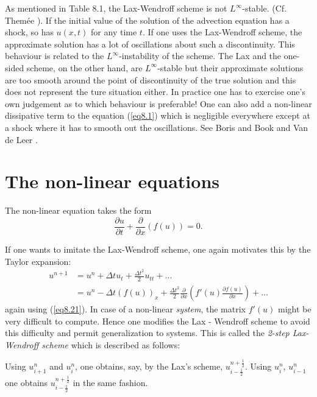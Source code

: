 \begin{remark}\label{chap8:rem8.4}
As mentioned in Table 8.1, the Lax-Wendroff scheme is not
$L^\infty$-stable. (Cf. Them\'ee \cite{key36}). If the initial value
of the solution of the advection equation has a shock, so has $u(x,t)$
for any time $t$. If one uses the Lax-Wendroff scheme, the approximate
solution has a lot of oscillations about such a discontinuity. This
behaviour is related to the $L^\infty$-instability of the scheme. The
Lax and the one-sided scheme, on the other hand, are $L^\infty$-stable
but their approximate solutions are too smooth around the point of
discontinuity of the true solution and this does not represent the
ture situation either. In practice one has to exercise one's own
judgement as to which behaviour is preferable! One can also add a
non-linear dissipative term to the equation (\ref{eq8.1}) which is
negligible everywhere except at a shock where it has to smooth out the
oscillations. See Boris and Book \cite{key4} and Van de Leer
\cite{key37}. 
\end{remark}

\section{The non-linear equations}\label{chap8:sec8.5}
The non-linear equation takes the form
\begin{equation*}
\frac{\partial u}{\partial t} + \frac{\partial}{\partial x} (f(u)) = 0.
\tag{8.21}\label{eq8.21}
\end{equation*}

If one wants to imitate the Lax-Wendroff scheme, one again motivates this by the Taylor expansion:
\begin{align*}
u^{n+1} & = u^n + \Delta t u_t + \frac{\Delta t^2}{2} u_{tt} + \ldots \\
& = u^n - \Delta t (f(u))_x + \frac{\Delta t^2}{2} \frac{\partial
}{\partial x} \left(f'(u) \frac{\partial f(u)}{\partial x}\right)  + \ldots  
\end{align*}\pageoriginale
again using (\ref{eq8.21}). In case of a non-linear {\em system}, the
matrix $f'(u)$ might be very difficult to compute. Hence one modifies
the Lax - Wendroff scheme to avoid this difficulty and permit
generalization to systems. This is called the {\em 2-step Lax-Wendroff
  scheme} which is described as follows: 

\medskip
{}
 Using $u^n_{i+1}$ and $u^n_i$, one obtains, say, by the Lax's scheme, $u^{n+\frac{1}{2}}_{i-\frac{1}{2}}$. Using $u^n_i$, $u^n_{i-1}$ one obtains  $u^{n+\frac{1}{2}}_{i-\frac{1}{2}}$ in the same fashion.

